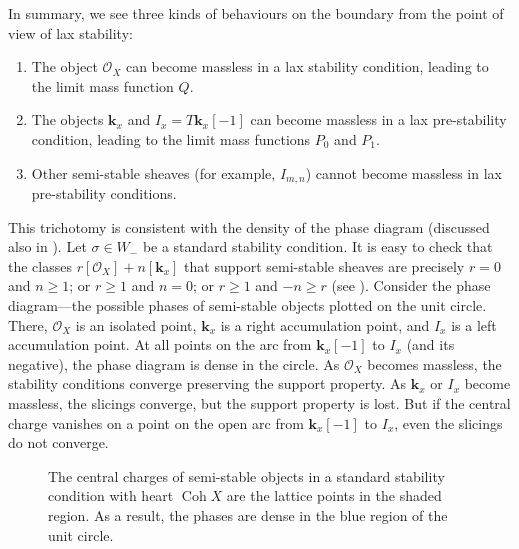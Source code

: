 \documentclass{amsart}
\begin{document}
In summary, we see three kinds of behaviours on the boundary from the point of view of lax stability:
\begin{enumerate}
\item The object \(\mathcal{O}_X\) can become massless in a lax stability condition, leading to the limit mass function \(Q\).
\item The objects \(\mathbf{k}_x\) and \(I_x = T \mathbf{k}_x[-1]\) can become massless in a lax pre-stability condition, leading to the limit mass functions \(P_0\) and \(P_{1}\).
 \item Other semi-stable sheaves (for example, \(I_{m,n}\)) cannot become massless in lax pre-stability conditions.
\end{enumerate}
This trichotomy is consistent with the density of the phase diagram (discussed also in \cite[\S~12]{bro.pau.plo.ea:22}).
Let \(\sigma \in W_-\) be a standard stability condition.
It is easy to check that the classes \(r [\mathcal{O}_X] + n [\mathbf{k}_x]\) that support semi-stable sheaves are precisely
\(r = 0\) and \(n \geq 1\); or \(r \geq 1\) and \(n = 0\); or \(r \geq 1\) and \(-n \geq r\) (see ).
Consider the phase diagram---the possible phases of semi-stable objects plotted on the unit circle.
There, \(\mathcal{O}_X\) is an isolated point, \(\mathbf{k}_x\) is a right accumulation point, and \(I_x\) is a left accumulation point.
At all points on the arc from \(\mathbf{k}_x[-1]\) to \(I_x\) (and its negative), the phase diagram is dense in the circle.
As \(\mathcal{O}_X\) becomes massless, the stability conditions converge preserving the support property.
As \(\mathbf{k}_x\) or \(I_x\) become massless, the slicings converge, but the support property is lost.
But if the central charge vanishes on a point on the open arc from \(\mathbf{k}_x[-1]\) to \(I_x\), even the slicings do not converge.
\begin{figure}
  \centering
\caption{The central charges of semi-stable objects in a standard stability condition with heart \(\operatorname{Coh}X\) are the lattice points in the shaded region.  As a result, the phases are dense in the blue region of the unit circle.}
\label{fig:semistables}
\end{figure}
\end{document}
